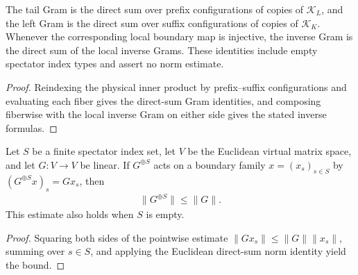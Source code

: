 \begin{lemma}%
    \label{thm:spectator_boundary_direct_sum_gram}
    \leanok
    The tail Gram is the direct sum over prefix configurations of copies of
    $\mathcal K_L$, and the left Gram is the direct sum over suffix
    configurations of copies of $\mathcal K_K$.  Whenever the
    corresponding local boundary map is injective, the inverse Gram is the
    direct sum of the local inverse Grams.  These identities include empty
    spectator index types and assert no norm estimate.
\end{lemma}
\begin{proof}
    \leanok
    Reindexing the physical inner product by prefix--suffix configurations and
    evaluating each fiber gives the direct-sum Gram identities, and composing
    fiberwise with the local inverse Gram on either side gives the stated
    inverse formulas.
\end{proof}

\begin{lemma}%
    \label{thm:boundary_fiberwise_map_norm}
    \leanok
    Let $S$ be a finite spectator index set, let $V$ be the Euclidean virtual
    matrix space, and let $G:V\to V$ be linear.  If $G^{\oplus S}$ acts on a
    boundary family $x=(x_s)_{s\in S}$ by
    $(G^{\oplus S}x)_s=Gx_s$, then
    \begin{align}
        \lVert G^{\oplus S}\rVert\leq \lVert G\rVert .
    \end{align}
    This estimate also holds when $S$ is empty.
\end{lemma}
\begin{proof}
    \leanok
    Squaring both sides of the pointwise estimate
    $\lVert Gx_s\rVert\leq\lVert G\rVert\lVert x_s\rVert$, summing over $s\in S$,
    and applying the Euclidean direct-sum norm identity yield the bound.
\end{proof}

